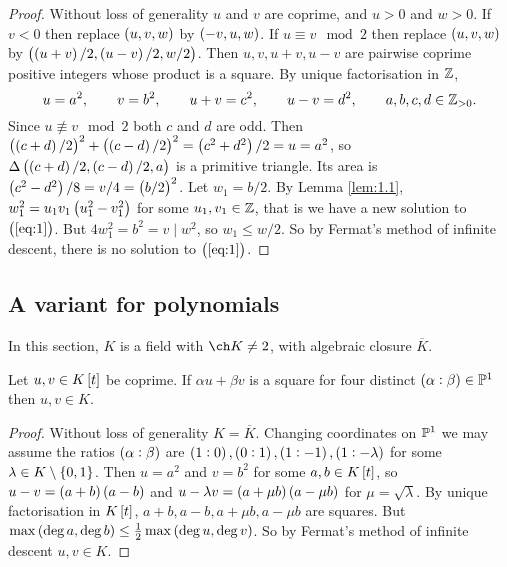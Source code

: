 \begin{proof}
Without loss of generality $ u $ and $ v $ are coprime, and $ u > 0 $ and $ w > 0 $. If $ v < 0 $ then replace $ \br{u, v, w} $ by $ \br{-v, u, w} $. If $ u \equiv v \mod 2 $ then replace $ \br{u, v, w} $ by $ \br{\br{u + v} / 2, \br{u - v} / 2, w / 2} $. Then $ u, v, u + v, u - v $ are pairwise coprime positive integers whose product is a square. By unique factorisation in $ \mathbb{Z} $,
$$ u = a^2, \qquad v = b^2, \qquad u + v = c^2, \qquad u - v = d^2, \qquad a, b, c, d \in \mathbb{Z}_{> 0}. $$
Since $ u \not\equiv v \mod 2 $ both $ c $ and $ d $ are odd. Then $ \br{\br{c + d} / 2}^2 + \br{\br{c - d} / 2}^2 = \br{c^2 + d^2} / 2 = u = a^2 $, so $ \Delta\br{\br{c + d} / 2, \br{c - d} / 2, a} $ is a primitive triangle. Its area is $ \br{c^2 - d^2} / 8 = v / 4 = \br{b / 2}^2 $. Let $ w_1 = b / 2 $. By Lemma \ref{lem:1.1}, $ w_1^2 = u_1v_1\br{u_1^2 - v_1^2} $ for some $ u_1, v_1 \in \mathbb{Z} $, that is we have a new solution to $ \br{\ref{eq:1}} $. But $ 4w_1^2 = b^2 = v \mid w^2 $, so $ w_1 \le w / 2 $. So by Fermat's method of infinite descent, there is no solution to $ \br{\ref{eq:1}} $.
\end{proof}

\pagebreak

\subsection{A variant for polynomials}

In this section, $ K $ is a field with $ \ch K \ne 2 $, with algebraic closure $ \overline{K} $.

\begin{lemma}
\label{lem:1.4}
Let $ u, v \in K\sbr{t} $ be coprime. If $ \alpha u + \beta v $ is a square for four distinct $ \br{\alpha : \beta} \in \PP^1 $ then $ u, v \in K $.
\end{lemma}

\begin{proof}
Without loss of generality $ K = \overline{K} $. Changing coordinates on $ \mathbb{P}^1 $ we may assume the ratios $ \br{\alpha : \beta} $ are $ \br{1 : 0}, \br{0 : 1}, \br{1 : -1}, \br{1 : -\lambda} $ for some $ \lambda \in K \setminus \cbr{0, 1} $. Then $ u = a^2 $ and $ v = b^2 $ for some $ a, b \in K\sbr{t} $, so $ u - v = \br{a + b}\br{a - b} $ and $ u - \lambda v = \br{a + \mu b}\br{a - \mu b} $ for $ \mu = \sqrt{\lambda} $. By unique factorisation in $ K\sbr{t} $, $ a + b, a - b, a + \mu b, a - \mu b $ are squares. But $ \max\br{\deg a, \deg b} \le \tfrac{1}{2}\max\br{\deg u, \deg v} $. So by Fermat's method of infinite descent $ u, v \in K $.
\end{proof}

